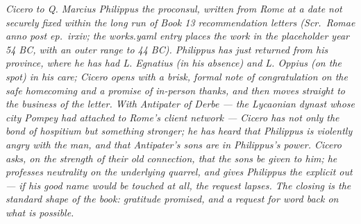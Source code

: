 
\textit{Cicero to Q. Marcius Philippus the proconsul,
written from Rome at a date not securely fixed within
the long run of Book 13 recommendation letters
(\textit{Scr.\ Romae anno post ep.\ irxiv}; the
works.yaml entry places the work in the placeholder
year 54 BC, with an outer range to 44 BC). Philippus has
just returned from his province, where he has had L.
Egnatius (in his absence) and L. Oppius (on the spot)
in his care; Cicero opens with a brisk, formal note of
congratulation on the safe homecoming and a promise of
in-person thanks, and then moves straight to the
business of the letter. With Antipater of Derbe ---
the Lycaonian dynast whose city Pompey had attached to
Rome's client network --- Cicero has not only the bond
of \textit{hospitium} but something stronger; he has
heard that Philippus is violently angry with the man,
and that Antipater's sons are in Philippus's power.
Cicero asks, on the strength of their old connection,
that the sons be given to him; he professes neutrality
on the underlying quarrel, and gives Philippus the
explicit out --- if his good name would be touched at
all, the request lapses. The closing is the standard
shape of the book: gratitude promised, and a request
for word back on what is possible.}
